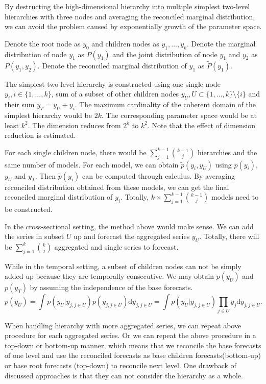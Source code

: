 \documentclass{article}
\begin{document}
   By destructing the high-dimensional hierarchy into multiple simplest two-level hierarchies with three nodes and averaging the reconciled marginal distribution, we can avoid the problem caused by exponentially growth of the parameter space. 

   Denote the root node as $y_0$ and children nodes as $y_1, \dots, y_k$. 
   Denote the marginal distribution of node $y_1$ as $P(y_1)$ and the joint distribution of node $y_1$ and $y_2$ as $P(y_1, y_2)$. 
   Denote the reconciled marginal distribution of $y_1$ as $\tilde P(y_1)$.

   The simplest two-level hierarchy is constructed using one single node $y_i, i\in \{1,\dots,k\}$, sum of a subset of other children nodes $y_{U}, U \subset \{1, \dots, k\} \setminus \{i\}$ and their sum $y_{T} = y_U + y_i$. The maximum cardinality of the coherent domain of the simplest hierarchy would be $2k$. The corresponding parameter space would be at least $k^2$. The dimension reduces from $2^k$ to $k^2$. Note that the effect of dimension reduction is estimated.

   For each single children node, there would be $\sum\limits_{j=1}^{k-1} {{k-1}\choose{j}}$ hierarchies and the same number of models.
   For each model, we can obtain $\tilde p(y_i, y_{U})$ using $p(y_i)$, $y_U$ and $y_{T}$. 
   Then $\tilde p(y_i)$ can be computed through calculus. 
   By averaging reconciled distribution obtained from these models, we can get the final reconciled marginal distribution of $y_i$. Totally, $k \times \sum\limits_{j=1}^{k-1} {{k-1}\choose{j}}$ models need to be constructed.

   In the cross-sectional setting, the method above would make sense. We can add the series in subset $U$ up and forecast the aggregated series $y_U$. Totally, there will be $\sum\limits_{j=1}^k{k\choose{j}}$ aggregated and single series to forecast.

   While in the temporal setting, a subset of children nodes can not be simply added up because they are temporally consecutive. 
   We may obtain $p(y_U)$ and $p(y_T)$ by assuming the independence of the base forecasts.
   \[p(y_U) = \int p(y_U|y_{j,  j\in U})p(y_{j, j\in U}) \text{d}y_{j, j\in U} = \int p(y_U|y_{j,  j\in U})\prod\limits_{j\in U}y_j \text{d}y_{j, j\in U}. \]

   When handling hierarchy with more aggregated series, we can repeat above procedure for each aggregated series. 
   Or we can repeat the above procedure in a top-down or bottom-up manner, which means that we reconcile the base forecasts of one level and use the reconciled forecasts as base children forecasts(bottom-up) or base root forecasts (top-down) to reconcile next level. One drawback of discussed approaches is that they can not consider the hierarchy as a whole.

    
    
\end{document}
